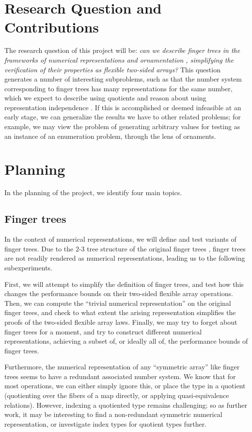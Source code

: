 
\section{Research Question and Contributions}\label{sec:research-question}
The research question of this project will be: \textit{can we describe finger trees \cite{fingertrees} in the frameworks of numerical representations and ornamentation \cite{progorn}, simplifying the verification of their properties as flexible two-sided arrays?} This question generates a number of interesting subproblems, such as that the number system corresponding to finger trees has many representations for the same number, which we expect to describe using quotients \cite{cuagda} and reason about using representation independence \cite{iri}. If this is accomplished or deemed infeasible at an early stage, we can generalize the results we have to other related problems; for example, we may view the problem of generating arbitrary values for testing as an instance of an enumeration problem, through the lens of ornaments.

\section{Planning}\label{sec:planning}
In the planning of the project, we identify four main topics.

\subsection{Finger trees}
In the context of numerical representations, we will define and test variants of finger trees. Due to the 2-3 tree structure of the original finger trees \cite{fingertrees}, finger trees are not readily rendered as numerical representations, leading us to the following subexperiments.

First, we will attempt to simplify the definition of finger trees, and test how this changes the performance bounds on their two-sided flexible array operations. Then, we can compute the ``trivial numerical representation'' on the original finger trees, and check to what extent the arising representation simplifies the proofs of the two-sided flexible array laws. Finally, we may try to forget about finger trees for a moment, and try to construct different numerical representations, achieving a subset of, or ideally all of, the performance bounds of finger trees.

Furthermore, the numerical representation of any ``symmetric array'' like finger trees seems to have a redundant associated number system. We know that for most operations, we can either simply ignore this, or place the type in a quotient (quotienting over the fibers of a map directly, or applying quasi-equivalence relations). However, indexing a quotiented type remains challenging; so  as further work, it may be interesting to find a non-redundant symmetric numerical representation, or investigate index types for quotient types further.


